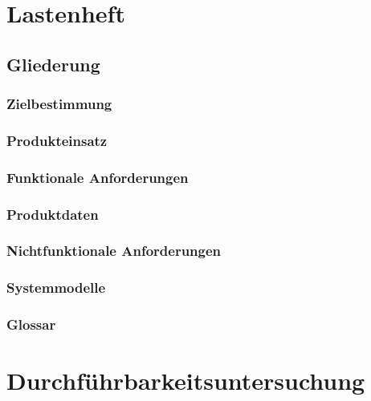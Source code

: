 \documentclass[a4paper]{article}
\theoremstyle{break}
\begin{document}
\section{Lastenheft}
\subsection{Gliederung}
\subsubsection{Zielbestimmung}
\subsubsection{Produkteinsatz}
\subsubsection{Funktionale Anforderungen}
\subsubsection{Produktdaten}
\subsubsection{Nichtfunktionale Anforderungen}
\subsubsection{Systemmodelle}
\subsubsection{Glossar}
\section{Durchführbarkeitsuntersuchung}
\end{document}
